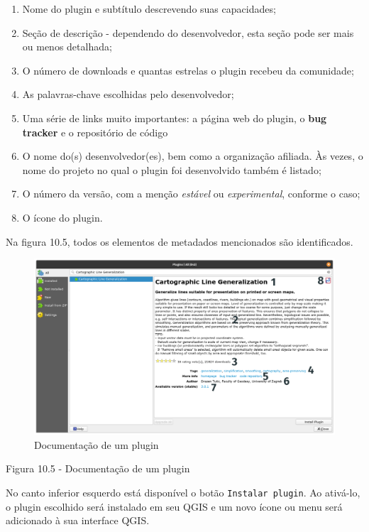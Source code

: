 \documentclass[
]{krantz}
\providecommand{\tightlist}{%
  \setlength{\itemsep}{0pt}\setlength{\parskip}{0pt}}
\begin{document}
\begin{enumerate}
\def\labelenumi{\arabic{enumi}.}
\tightlist
\item
  Nome do plugin e subtítulo descrevendo suas capacidades;
\item
  Seção de descrição - dependendo do desenvolvedor, esta seção pode ser mais ou menos detalhada;
\item
  O número de downloads e quantas estrelas o plugin recebeu da comunidade;
\item
  As palavras-chave escolhidas pelo desenvolvedor;
\item
  Uma série de links muito importantes: a página web do plugin, o \textbf{bug tracker} e o repositório de código
\item
  O nome do(s) desenvolvedor(es), bem como a organização afiliada. Às vezes, o nome do projeto no qual o plugin foi desenvolvido também é listado;
\item
  O número da versão, com a menção \emph{estável} ou \emph{experimental}, conforme o caso;
\item
  O ícone do plugin.
\end{enumerate}

Na figura 10.5, todos os elementos de metadados mencionados são identificados.

\begin{figure}
\centering
\includegraphics{media/modulo10/fig105.png}
\caption{Documentação de um plugin}
\end{figure}

Figura 10.5 - Documentação de um plugin

No canto inferior esquerdo está disponível o botão \texttt{Instalar\ plugin}. Ao ativá-lo, o plugin escolhido será instalado em seu QGIS e um novo ícone ou menu será adicionado à sua interface QGIS.
\end{document}
